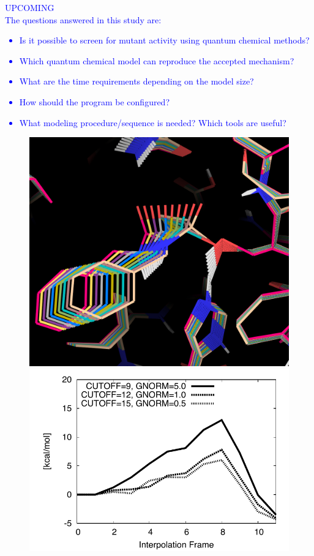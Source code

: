 \textcolor{blue}{
UPCOMING\\
The questions answered in this study are:
\begin{itemize}
\item Is it possible to screen for mutant activity using quantum chemical methods?
\item Which quantum chemical model can reproduce the accepted mechanism?
\item What are the time requirements depending on the model size?
\item How should the program be configured?
\item What modeling procedure/sequence is needed? Which tools are useful?
\end{itemize}
\begin{figure}[htbp] 
\centering
\begin{minipage}{0.43\linewidth}
\includegraphics[width=0.90\linewidth]{wt-ini.png}
\end{minipage}
\begin{minipage}{0.55\linewidth}
\includegraphics[width=1.00\linewidth]{calb-conv.pdf}

\end{minipage}
\end{figure}}
